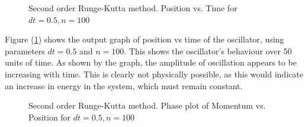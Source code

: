 \documentclass[pdf,color]{UoBnote}
\begin{document}
	\begin{figure}[H]
					\centering
					\caption{Second order Runge-Kutta method. Position vs. Time for $dt = 0.5, n = 100$}
					\label{fig:rk2-05-100-xt}
				\end{figure}
				
Figure (\ref{fig:rk2-05-100-xt}) shows the output graph of position vs time of the oscillator, using parameters $dt = 0.5$ and $n = 100$. This shows the oscillator's behaviour over 50 units of time. As shown by the graph, the amplitude of oscillation appears to be increasing with time. This is clearly not physically possible, as this would indicate an increase in energy in the system, which must remain constant.		
				
	\begin{figure}[H]
					\centering
					\caption{Second order Runge-Kutta method. Phase plot of Momentum vs. Position for $dt = 0.5, n = 100$}
					\label{fig:rk2-05-100-phase}
				\end{figure}
				
\end{document}
